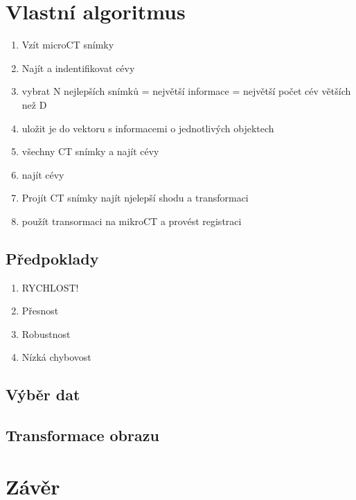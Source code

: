 \documentclass{thesis}%
\begin{document}
 

\chapter{Vlastní algoritmus}
\begin{enumerate}
\item Vzít microCT snímky
\item Najít a indentifikovat cévy 
\item vybrat N nejlepších snímků = největší informace = největší počet cév větších než D
\item uložit je do vektoru s informacemi o jednotlivých objektech
\item všechny CT snímky a najít cévy
\item najít cévy
\item Projít CT snímky najít njelepší shodu a transformaci
\item použít transormaci na mikroCT a provést registraci
\end{enumerate}

\section{Předpoklady}
\begin{enumerate}
\item RYCHLOST!
\item Přesnost
\item Robustnost
\item Nízká chybovost
\end{enumerate}
\section{Výběr dat }
\section{Transformace obrazu}


\chapter{Závěr}

\newpage
\listoffigures
\listoftables
\end{document}
